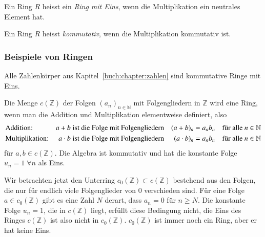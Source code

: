 \begin{definition}
%
Ein Ring $R$ heisst ein {\em Ring mit Eins}, wenn die Multiplikation ein
neutrales Element hat.
%
\end{definition}

\begin{definition}
%
%
Ein Ring $R$ heisst {\em kommutativ}, wenn die Multiplikation kommutativ
ist.
\end{definition}

\subsubsection{Beispiele von Ringen}

\begin{beispiel}
Alle Zahlenkörper aus Kapitel~\ref{buch:chapter:zahlen} sind kommutative
Ringe mit Eins.
\end{beispiel}

\begin{beispiel}
Die Menge $c(\mathbb{Z})$ der Folgen $(a_n)_{n\in\mathbb{N}}$ mit
Folgengliedern in $\mathbb{Z}$ wird eine Ring, wenn man die Addition
und Multiplikation elementweise definiert, also
\begin{align*}
&\text{Addition:}
&
a+b&\text{\;ist die Folge mit Folgengliedern}&
(a+b)_n &= a_nb_n \quad\text{für alle $n\in\mathbb{N}$}
\\
&\text{Multiplikation:}
&
a\cdot b&\text{\;ist die Folge mit Folgengliedern}&
(a\cdot b)_n &=  a_nb_n \quad\text{für alle $n\in\mathbb{N}$}
\end{align*}
für $a,b\in c(\mathbb{Z})$.
Die Algebra ist kommutativ und hat die konstante Folge 
$u_n = 1\;\forall n$ als Eins.

Wir betrachten jetzt den Unterring $c_0(\mathbb{Z})\subset c(\mathbb{Z})$
bestehend aus den Folgen, die nur für endlich viele Folgenglieder von
$0$ verschieden sind.
Für eine Folge $a\in c_0(\mathbb{Z})$ gibt es eine Zahl $N$ derart, dass
$a_n=0$ für $n\ge N$.
Die konstante Folge $u_n=1$, die in $c(\mathbb{Z})$ liegt, erfüllt diese
Bedingung nicht, die Eins des Ringes $c(\mathbb{Z})$ ist also nicht in
$c_0(\mathbb{Z})$.
$c_0(\mathbb{Z})$ ist immer noch ein Ring, aber er hat keine Eins.
\end{beispiel}

